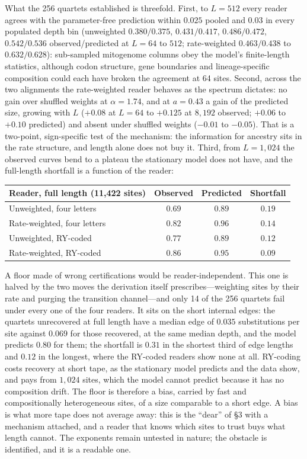 \documentclass[11pt]{article}
\begin{document}
What the 256 quartets established is threefold. First, to $L=512$ every reader agrees with the parameter-free prediction within $0.025$ pooled and $0.03$ in every populated depth bin (unweighted $0.380/0.375$, $0.431/0.417$, $0.486/0.472$, $0.542/0.536$ observed/predicted at $L=64$ to $512$; rate-weighted $0.463/0.438$ to $0.632/0.628$): sub-sampled mitogenome columns obey the model's finite-length statistics, although codon structure, gene boundaries and lineage-specific composition could each have broken the agreement at 64 sites. Second, across the two alignments the rate-weighted reader behaves as the spectrum dictates: no gain over shuffled weights at $\alpha=1.74$, and at $a=0.43$ a gain of the predicted size, growing with $L$ ($+0.08$ at $L=64$ to $+0.125$ at $8{,}192$ observed; $+0.06$ to $+0.10$ predicted) and absent under shuffled weights ($-0.01$ to $-0.05$). That is a two-point, sign-specific test of the mechanism: the information for ancestry sits in the rate structure, and length alone does not buy it. Third, from $L=1{,}024$ the observed curves bend to a plateau the stationary model does not have, and the full-length shortfall is a function of the reader:

\begin{center}\small
\begin{tabular}{@{}lccc@{}}
\toprule
\textbf{Reader, full length (11,422 sites)} & \textbf{Observed} & \textbf{Predicted} & \textbf{Shortfall} \\
\midrule
Unweighted, four letters & $0.69$ & $0.89$ & $0.19$ \\
Rate-weighted, four letters & $0.82$ & $0.96$ & $0.14$ \\
Unweighted, RY-coded & $0.77$ & $0.89$ & $0.12$ \\
Rate-weighted, RY-coded & $0.86$ & $0.95$ & $0.09$ \\
\bottomrule
\end{tabular}
\end{center}

\noindent A floor made of wrong certifications would be reader-independent. This one is halved by the two moves the derivation itself prescribes---weighting sites by their rate and purging the transition channel---and only 14 of the 256 quartets fail under every one of the four readers. It sits on the short internal edges: the quartets unrecovered at full length have a median edge of $0.035$ substitutions per site against $0.069$ for those recovered, at the same median depth, and the model predicts $0.80$ for them; the shortfall is $0.31$ in the shortest third of edge lengths and $0.12$ in the longest, where the RY-coded readers show none at all. RY-coding costs recovery at short tape, as the stationary model predicts and the data show, and pays from $1{,}024$ sites, which the model cannot predict because it has no composition drift. The floor is therefore a bias, carried by fast and compositionally heterogeneous sites, of a size comparable to a short edge. A bias is what more tape does not average away: this is the ``dear'' of \S3 with a mechanism attached, and a reader that knows which sites to trust buys what length cannot. The exponents remain untested in nature; the obstacle is identified, and it is a readable one.
\end{document}
